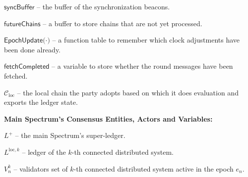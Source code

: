 \begin{legal}
    \item[\ding{113}] $\textsf{syncBuffer}$ -- the buffer of the synchronization beacons.
    \item[\ding{113}] $\textsf{futureChains}$ -- a buﬀer to store chains that are not yet processed.
    \item[\ding{113}] $\textsf{EpochUpdate(·)}$ -- a function table to remember which clock adjustments have been done already.
    \item[\ding{113}] $\textsf{fetchCompleted}$ -- a variable to store whether the round messages have been fetched.
    \item[\ding{113}] $\mathcal{C}_{\text{loc}}$ -- the local chain the party adopts based on which it does evaluation and
    exports the ledger state.

\end{legal}
\bigbreak

\noindent
\textbf{Main Spectrum's Consensus Entities, Actors and Variables:}
\begin{legal}
    \item[\ding{113}] $L^+$ -- the main Spectrum's super-ledger.
    \item[\ding{113}] $L^{\text{loc}, k}$ -- ledger of the $k$-th connected distributed system.
    \item[\ding{113}] $V^k_n$ -- validators set of $k$-th connected distributed system active in the epoch $e_n$.
\end{legal}
